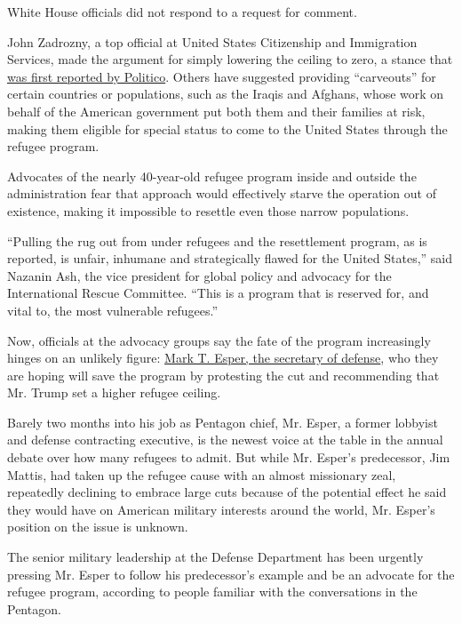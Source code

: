 White House officials did not respond to a request for comment.

John Zadrozny, a top official at United States Citizenship and
Immigration Services, made the argument for simply lowering the ceiling
to zero, a stance that
\href{https://www.politico.com/story/2019/07/18/trump-officials-refugee-zero-1603503}{was
first reported by Politico}. Others have suggested providing
``carveouts'' for certain countries or populations, such as the Iraqis
and Afghans, whose work on behalf of the American government put both
them and their families at risk, making them eligible for special status
to come to the United States through the refugee program.

Advocates of the nearly 40-year-old refugee program inside and outside
the administration fear that approach would effectively starve the
operation out of existence, making it impossible to resettle even those
narrow populations.

``Pulling the rug out from under refugees and the resettlement program,
as is reported, is unfair, inhumane and strategically flawed for the
United States,'' said Nazanin Ash, the vice president for global policy
and advocacy for the International Rescue Committee. ``This is a program
that is reserved for, and vital to, the most vulnerable refugees.''

Now, officials at the advocacy groups say the fate of the program
increasingly hinges on an unlikely figure:
\href{https://www.nytimes3xbfgragh.onion/2019/07/23/us/politics/mark-esper-secretary-defense.html}{Mark
T. Esper, the secretary of defense}, who they are hoping will save the
program by protesting the cut and recommending that Mr. Trump set a
higher refugee ceiling.

Barely two months into his job as Pentagon chief, Mr. Esper, a former
lobbyist and defense contracting executive, is the newest voice at the
table in the annual debate over how many refugees to admit. But while
Mr. Esper's predecessor, Jim Mattis, had taken up the refugee cause with
an almost missionary zeal, repeatedly declining to embrace large cuts
because of the potential effect he said they would have on American
military interests around the world, Mr. Esper's position on the issue
is unknown.

The senior military leadership at the Defense Department has been
urgently pressing Mr. Esper to follow his predecessor's example and be
an advocate for the refugee program, according to people familiar with
the conversations in the Pentagon.

